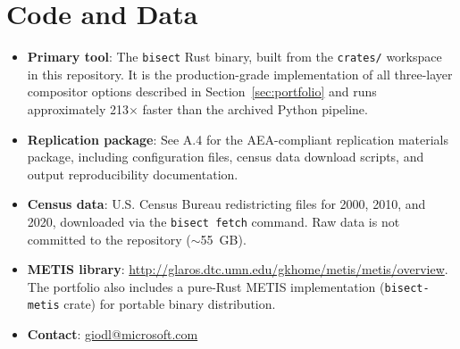 \documentclass[12pt]{article}
\begin{document}
\section{Code and Data}

\begin{itemize}[leftmargin=*,noitemsep,topsep=4pt]
    \item \textbf{Primary tool}: The \texttt{bisect} Rust binary, built from
        the \texttt{crates/} workspace in this repository. It is the
        production-grade implementation of all three-layer compositor options
        described in Section~\ref{sec:portfolio} and runs approximately
        213$\times$ faster than the archived Python pipeline.

    \item \textbf{Replication package}: See A.4 for the AEA-compliant
        replication materials package, including configuration files, census
        data download scripts, and output reproducibility documentation.

    \item \textbf{Census data}: U.S. Census Bureau redistricting files for
        2000, 2010, and 2020, downloaded via the \texttt{bisect fetch} command.
        Raw data is not committed to the repository ($\sim$55~GB).

    \item \textbf{METIS library}: \url{http://glaros.dtc.umn.edu/gkhome/metis/metis/overview}.
        The portfolio also includes a pure-Rust METIS implementation
        (\texttt{bisect-metis} crate) for portable binary distribution.

    \item \textbf{Contact}: \href{mailto:giodl@microsoft.com}{giodl@microsoft.com}
\end{itemize}
\end{document}
